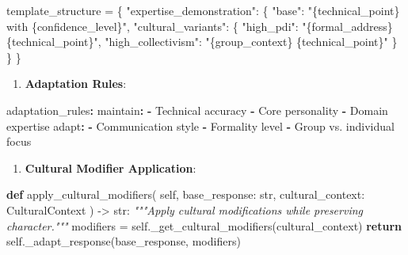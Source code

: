 \documentclass[
]{article}
\newenvironment{Shaded}{}{}
\newcommand{\AttributeTok}[1]{\textcolor[rgb]{0.49,0.56,0.16}{#1}}
\newcommand{\BuiltInTok}[1]{\textcolor[rgb]{0.00,0.50,0.00}{#1}}
\newcommand{\CommentTok}[1]{\textcolor[rgb]{0.38,0.63,0.69}{\textit{#1}}}
\newcommand{\ControlFlowTok}[1]{\textcolor[rgb]{0.00,0.44,0.13}{\textbf{#1}}}
\newcommand{\FunctionTok}[1]{\textcolor[rgb]{0.02,0.16,0.49}{#1}}
\newcommand{\KeywordTok}[1]{\textcolor[rgb]{0.00,0.44,0.13}{\textbf{#1}}}
\newcommand{\NormalTok}[1]{#1}
\newcommand{\OperatorTok}[1]{\textcolor[rgb]{0.40,0.40,0.40}{#1}}
\newcommand{\SpecialCharTok}[1]{\textcolor[rgb]{0.25,0.44,0.63}{#1}}
\newcommand{\StringTok}[1]{\textcolor[rgb]{0.25,0.44,0.63}{#1}}
\newcommand{\VariableTok}[1]{\textcolor[rgb]{0.10,0.09,0.49}{#1}}
\providecommand{\tightlist}{%
  \setlength{\itemsep}{0pt}\setlength{\parskip}{0pt}}
\begin{document}
\begin{Shaded}
\begin{Highlighting}[]
\NormalTok{template\_structure }\OperatorTok{=}\NormalTok{ \{}
    \StringTok{"expertise\_demonstration"}\NormalTok{: \{}
        \StringTok{"base"}\NormalTok{: }\StringTok{"}\SpecialCharTok{\{technical\_point\}}\StringTok{ with }\SpecialCharTok{\{confidence\_level\}}\StringTok{"}\NormalTok{,}
        \StringTok{"cultural\_variants"}\NormalTok{: \{}
            \StringTok{"high\_pdi"}\NormalTok{: }\StringTok{"}\SpecialCharTok{\{formal\_address\}}\StringTok{ }\SpecialCharTok{\{technical\_point\}}\StringTok{"}\NormalTok{,}
            \StringTok{"high\_collectivism"}\NormalTok{: }\StringTok{"}\SpecialCharTok{\{group\_context\}}\StringTok{ }\SpecialCharTok{\{technical\_point\}}\StringTok{"}
\NormalTok{        \}}
\NormalTok{    \}}
\NormalTok{\}}
\end{Highlighting}
\end{Shaded}

\begin{enumerate}
\def\labelenumi{\arabic{enumi}.}
\setcounter{enumi}{1}
\tightlist
\item
  \textbf{Adaptation Rules}:
\end{enumerate}

\begin{Shaded}
\begin{Highlighting}[]
\FunctionTok{adaptation\_rules}\KeywordTok{:}
\AttributeTok{  }\FunctionTok{maintain}\KeywordTok{:}
\AttributeTok{    }\KeywordTok{{-}}\AttributeTok{ Technical accuracy}
\AttributeTok{    }\KeywordTok{{-}}\AttributeTok{ Core personality}
\AttributeTok{    }\KeywordTok{{-}}\AttributeTok{ Domain expertise}
\AttributeTok{  }\FunctionTok{adapt}\KeywordTok{:}
\AttributeTok{    }\KeywordTok{{-}}\AttributeTok{ Communication style}
\AttributeTok{    }\KeywordTok{{-}}\AttributeTok{ Formality level}
\AttributeTok{    }\KeywordTok{{-}}\AttributeTok{ Group vs. individual focus}
\end{Highlighting}
\end{Shaded}

\begin{enumerate}
\def\labelenumi{\arabic{enumi}.}
\setcounter{enumi}{2}
\tightlist
\item
  \textbf{Cultural Modifier Application}:
\end{enumerate}

\begin{Shaded}
\begin{Highlighting}[]
\KeywordTok{def}\NormalTok{ apply\_cultural\_modifiers(}
    \VariableTok{self}\NormalTok{,}
\NormalTok{    base\_response: }\BuiltInTok{str}\NormalTok{,}
\NormalTok{    cultural\_context: CulturalContext}
\NormalTok{) }\OperatorTok{{-}\textgreater{}} \BuiltInTok{str}\NormalTok{:}
    \CommentTok{"""Apply cultural modifications while preserving character."""}
\NormalTok{    modifiers }\OperatorTok{=} \VariableTok{self}\NormalTok{.\_get\_cultural\_modifiers(cultural\_context)}
    \ControlFlowTok{return} \VariableTok{self}\NormalTok{.\_adapt\_response(base\_response, modifiers)}
\end{Highlighting}
\end{Shaded}
\end{document}
